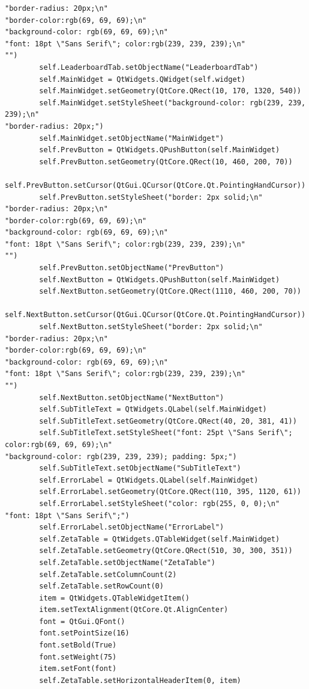 \documentclass[12pt]{article}
\begin{document}
\begin{lstlisting}
"border-radius: 20px;\n"
"border-color:rgb(69, 69, 69);\n"
"background-color: rgb(69, 69, 69);\n"
"font: 18pt \"Sans Serif\"; color:rgb(239, 239, 239);\n"
"")
        self.LeaderboardTab.setObjectName("LeaderboardTab")
        self.MainWidget = QtWidgets.QWidget(self.widget)
        self.MainWidget.setGeometry(QtCore.QRect(10, 170, 1320, 540))
        self.MainWidget.setStyleSheet("background-color: rgb(239, 239, 239);\n"
"border-radius: 20px;")
        self.MainWidget.setObjectName("MainWidget")
        self.PrevButton = QtWidgets.QPushButton(self.MainWidget)
        self.PrevButton.setGeometry(QtCore.QRect(10, 460, 200, 70))
        self.PrevButton.setCursor(QtGui.QCursor(QtCore.Qt.PointingHandCursor))
        self.PrevButton.setStyleSheet("border: 2px solid;\n"
"border-radius: 20px;\n"
"border-color:rgb(69, 69, 69);\n"
"background-color: rgb(69, 69, 69);\n"
"font: 18pt \"Sans Serif\"; color:rgb(239, 239, 239);\n"
"")
        self.PrevButton.setObjectName("PrevButton")
        self.NextButton = QtWidgets.QPushButton(self.MainWidget)
        self.NextButton.setGeometry(QtCore.QRect(1110, 460, 200, 70))
        self.NextButton.setCursor(QtGui.QCursor(QtCore.Qt.PointingHandCursor))
        self.NextButton.setStyleSheet("border: 2px solid;\n"
"border-radius: 20px;\n"
"border-color:rgb(69, 69, 69);\n"
"background-color: rgb(69, 69, 69);\n"
"font: 18pt \"Sans Serif\"; color:rgb(239, 239, 239);\n"
"")
        self.NextButton.setObjectName("NextButton")
        self.SubTitleText = QtWidgets.QLabel(self.MainWidget)
        self.SubTitleText.setGeometry(QtCore.QRect(40, 20, 381, 41))
        self.SubTitleText.setStyleSheet("font: 25pt \"Sans Serif\"; color:rgb(69, 69, 69);\n"
"background-color: rgb(239, 239, 239); padding: 5px;")
        self.SubTitleText.setObjectName("SubTitleText")
        self.ErrorLabel = QtWidgets.QLabel(self.MainWidget)
        self.ErrorLabel.setGeometry(QtCore.QRect(110, 395, 1120, 61))
        self.ErrorLabel.setStyleSheet("color: rgb(255, 0, 0);\n"
"font: 18pt \"Sans Serif\";")
        self.ErrorLabel.setObjectName("ErrorLabel")
        self.ZetaTable = QtWidgets.QTableWidget(self.MainWidget)
        self.ZetaTable.setGeometry(QtCore.QRect(510, 30, 300, 351))
        self.ZetaTable.setObjectName("ZetaTable")
        self.ZetaTable.setColumnCount(2)
        self.ZetaTable.setRowCount(0)
        item = QtWidgets.QTableWidgetItem()
        item.setTextAlignment(QtCore.Qt.AlignCenter)
        font = QtGui.QFont()
        font.setPointSize(16)
        font.setBold(True)
        font.setWeight(75)
        item.setFont(font)
        self.ZetaTable.setHorizontalHeaderItem(0, item)

\end{lstlisting}
\end{document}
